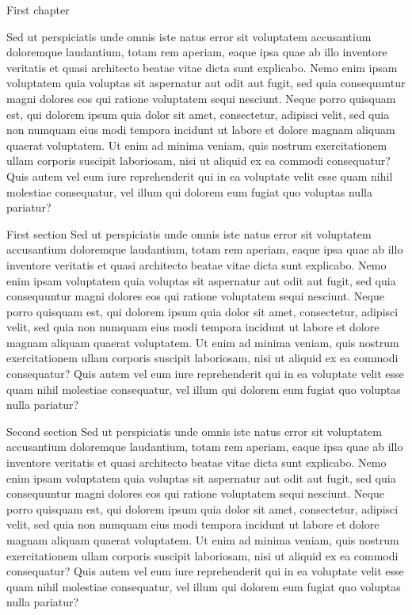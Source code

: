 \documentclass{article}
\begin{document}
	\begin{mychapter}{First chapter}

	Sed ut perspiciatis unde omnis iste natus error sit voluptatem accusantium doloremque laudantium, totam rem aperiam, eaque ipsa quae ab illo inventore veritatis et quasi architecto beatae vitae dicta sunt explicabo. Nemo enim ipsam voluptatem quia voluptas sit aspernatur aut odit aut fugit, sed quia consequuntur magni dolores eos qui ratione voluptatem sequi nesciunt. Neque porro quisquam est, qui dolorem ipsum quia dolor sit amet, consectetur, adipisci velit, sed quia non numquam eius modi tempora incidunt ut labore et dolore magnam aliquam quaerat voluptatem. Ut enim ad minima veniam, quis nostrum exercitationem ullam corporis suscipit laboriosam, nisi ut aliquid ex ea commodi consequatur? Quis autem vel eum iure reprehenderit qui in ea voluptate velit esse quam nihil molestiae consequatur, vel illum qui dolorem eum fugiat quo voluptas nulla pariatur?
	
	\begin{mysection}{First section}
			Sed ut perspiciatis unde omnis iste natus error sit voluptatem accusantium doloremque laudantium, totam rem aperiam, eaque ipsa quae ab illo inventore veritatis et quasi architecto beatae vitae dicta sunt explicabo. Nemo enim ipsam voluptatem quia voluptas sit aspernatur aut odit aut fugit, sed quia consequuntur magni dolores eos qui ratione voluptatem sequi nesciunt. Neque porro quisquam est, qui dolorem ipsum quia dolor sit amet, consectetur, adipisci velit, sed quia non numquam eius modi tempora incidunt ut labore et dolore magnam aliquam quaerat voluptatem. Ut enim ad minima veniam, quis nostrum exercitationem ullam corporis suscipit laboriosam, nisi ut aliquid ex ea commodi consequatur? Quis autem vel eum iure reprehenderit qui in ea voluptate velit esse quam nihil molestiae consequatur, vel illum qui dolorem eum fugiat quo voluptas nulla pariatur?
	\end{mysection}
	
	\begin{mysection}{Second section}
	Sed ut perspiciatis unde omnis iste natus error sit voluptatem accusantium doloremque laudantium, totam rem aperiam, eaque ipsa quae ab illo inventore veritatis et quasi architecto beatae vitae dicta sunt explicabo. Nemo enim ipsam voluptatem quia voluptas sit aspernatur aut odit aut fugit, sed quia consequuntur magni dolores eos qui ratione voluptatem sequi nesciunt. Neque porro quisquam est, qui dolorem ipsum quia dolor sit amet, consectetur, adipisci velit, sed quia non numquam eius modi tempora incidunt ut labore et dolore magnam aliquam quaerat voluptatem. Ut enim ad minima veniam, quis nostrum exercitationem ullam corporis suscipit laboriosam, nisi ut aliquid ex ea commodi consequatur? Quis autem vel eum iure reprehenderit qui in ea voluptate velit esse quam nihil molestiae consequatur, vel illum qui dolorem eum fugiat quo voluptas nulla pariatur?
	\end{mysection}	
	


\end{mychapter}
\end{document}
